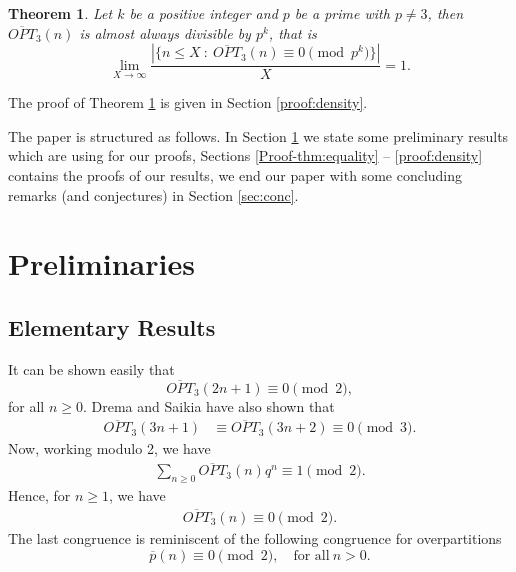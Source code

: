\documentclass[12pt,reqno]{amsart}
\numberwithin{equation}{section}
\newcommand{\op}{\overline{p}}
\newcommand{\opt}{\overline{OPT}}
\newtheorem{theorem}{Theorem}[section]
\begin{document}
\begin{theorem}\label{thm:m2}
    Let $k$ be a positive integer and $p$ be a prime with $p\neq 3$, then $\opt_3(n)$ is almost always divisible by $p^{k}$, that is
    \[
    \lim\limits_{X\rightarrow \infty}\frac{|\{n\leq X~:~\opt_3(n)\equiv 0 \pmod{p^{k}}\}|}{X}=1.
    \]
\end{theorem}
\noindent The proof of Theorem \ref{thm:m2} is given in Section \ref{proof:density}.


The paper is structured as follows. In Section \ref{sec:prelim} we state some preliminary results which are using for our proofs, Sections \ref{Proof-thm:equality} -- \ref{proof:density} contains the proofs of our results, we end our paper with some concluding remarks (and conjectures) in Section \ref{sec:conc}.


\section{Preliminaries}\label{sec:prelim}

\subsection{Elementary Results}\label{sec: elementary}


It can be shown easily \cite[Eq. (43)]{DremaSaikia} that
\[
\opt_3(2n+1)\equiv 0 \pmod 2,
\]
for all $n\geq 0$. Drema and Saikia \cite[Eq. (88)]{DremaSaikia} have also shown that
\begin{align}\label{ds-1}
    \opt_3(3n+1) &\equiv \opt_3(3n+2) \equiv 0 \pmod{3}.
\end{align}
Now, working modulo 2, we have
\begin{align}\label{eq:eq}
     \sum_{n\geq 0}\opt_3(n)q^n \equiv1\pmod{2}.
\end{align}
Hence, for $n\geq1$, we have
\begin{align}
    \opt_3(n) \equiv 0 \pmod{2}.\label{n2}
\end{align}
The last congruence is reminiscent of the following congruence for overpartitions
\[
\op(n)\equiv 0 \pmod 2, \quad \text{for all}~n>0.
\]
\end{document}
